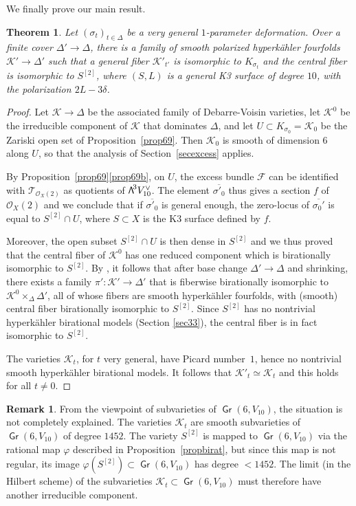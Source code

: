\documentclass[11pt]{article}
\let\mathcal\mathscr
\newtheorem{theo}[lemm]{Theorem}
\theoremstyle{definition}
\newtheorem{rema}[lemm]{Remark}
\newcommand\cF{\mathcal{F}}
\newcommand\cK{\mathcal{K}}
\newcommand\cO{\mathcal{O}}\let\OO\cO
\newcommand\cT{\mathcal{T}}
\DeclareMathOperator{\Gr}{\mathsf{Gr}}
\let\phi\varphi
\let\cong\simeq
\newcommand\bw[1]{{\hbox{\large$\mathsf{\Lambda}$}^{\!#1}}}
\newcommand\hilbS{S^{[2]}}
\newcommand\hk{hyperkähler\xspace}
\begin{document}
We finally prove our main result.

\begin{theo} \label{theopourgenre6}
Let $(\sigma_t)_{t\in \Delta}$ be a very general $1$-parameter deformation.
Over a finite cover $\Delta'\!\to\!\Delta$, there is a family of smooth polarized \hk fourfolds
\hbox{$\cK'\!\to\!\Delta'$} such that a general fiber
$\cK'_{t'}$ is isomorphic to $K_{\sigma_t}$ and the central fiber
is isomorphic to
$\hilbS$, where $(S,L)$ is a general K3 surface of degree $10$, with the polarization $2L-3\delta$.
\end{theo}

\begin{proof} Let $ \cK\to \Delta$ be the associated family of Debarre-Voisin varieties, let $\cK^0$ be the irreducible component of $\cK$ that dominates $\Delta$, and let $U\subset K_{\sigma_0}=\cK_0$ be the Zariski open set of Proposition~\ref{prop69}. Then $ \cK_0$ is smooth of dimension $6$ along $U$, so that the analysis of Section~\ref{secexcess}
applies.

By Proposition~\ref{prop69}\eqref{prop69b}, on $U$, the excess bundle
$\cF$ can be identified with $\cT_{\cO_X(2)}$ as quotients of $\bw3V_{10}^\vee$. The element $\overline{\sigma'_0}$
thus gives a section
$f$ of $ \cO_X(2)$ and we conclude that if $\overline {\sigma'_0}$ is general enough, the zero-locus of $\overline {\sigma_0'}$
is equal to $\hilbS\cap U$, where
$S\subset X$ is the K3 surface defined by $f$.

Moreover, the open subset $\hilbS\cap U$ is then dense in $\hilbS$
and we thus proved that the central fiber of $\cK^0$ has one reduced component which is birationally isomorphic to $\hilbS$.
By \cite{KLSV}, it follows that after base change $\Delta'\to \Delta$ and shrinking, there exists a family
$\pi'\colon\cK'\to \Delta'$ that is fiberwise birationally isomorphic to $\cK^0\times_\Delta\Delta'$, all of whose fibers
are smooth \hk fourfolds, with (smooth) central fiber birationally isomorphic to $\hilbS$. Since $\hilbS$ has no nontrivial \hk birational models (Section \ref{sec33}), the central fiber is in fact isomorphic to $\hilbS$.

The varieties $\cK_t$, for $t$ very general, have Picard number~$1$, hence no nontrivial smooth \hk birational models. It follows that $\cK'_t\cong \cK_t$ and this holds for all $t\ne 0$.
\end{proof}

\begin{rema}
From the viewpoint of subvarieties of $\Gr(6,V_{10})$, the situation is not completely explained. The varieties
$\cK_t$ are smooth subvarieties of $\Gr(6,V_{10})$ of degree $1452$. The variety $\hilbS$ is mapped to $\Gr(6,V_{10})$ via
the rational map $\phi$ described in Proposition~\ref{propbirat}, but since this map
is not regular, its image $\phi(\hilbS)\subset \Gr(6,V_{10})$ has degree $<1452$. The limit (in the Hilbert scheme) of the subvarieties
$\cK_t\subset \Gr(6,V_{10})$ must therefore have another irreducible component.
\end{rema}
\end{document}
